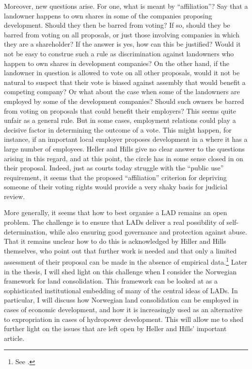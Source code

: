 Moreover, new questions arise. For one, what is meant by ``affiliation''? Say that a landowner happens to own shares in some of the companies proposing development. Should they then be barred from voting? If so, should they be barred from voting on all proposals, or just those involving companies in which they are a shareholder? If the answer is yes, how can this be justified? Would it not be easy to construe such a rule as discrimination against landowners who happen to own shares in development companies? On the other hand, if the landowner in question is allowed to vote on all other proposals, would it not be natural to suspect that their vote is biased against assembly that would benefit a competing company? Or what about the case when some of the landowners are employed by some of the development companies? Should such owners be barred from voting on proposals that could benefit their employers? This seems quite unfair as a general rule. But in some cases, employment relations could play a decisive factor in determining the outcome of a vote. This might happen, for instance, if an important local employer proposes development in a  where it has a large number of employees. Heller and Hills give no clear answer to the questions arising in this regard, and at this point, the circle has in some sense closed in on their proposal. Indeed, just as courts today struggle with the ``public use'' requirement, it seems that the proposed ``affiliation'' criterion for depriving someone of their voting rights would provide a very shaky basis for judicial review. 

More generally, it seems that how to best organise a LAD remains an open problem. The challenge is to ensure that LADs deliver a real possibility of self-determination, while also ensuring good governance and protection against abuse. That it remains unclear how to do this is acknowledged by Hiller and Hills themselves, who point out that further work is needed and that only a limited assessment of their proposal can be made in the absence of empirical data.\footnote{See \cite[]{heller08}.} Later in the thesis, I will shed light on this challenge when I consider the Norwegian framework for land consolidation. This framework can be looked at as a sophisticated institutional embedding of many of the central ideas of LADs. In particular, I will discuss how Norwegian land consolidation can be employed in cases of economic development, and how it is increasingly used as an alternative to expropriation in cases of hydropower development. This will allow me to shed further light on the issues that are left open by Heller and Hills' important article.

